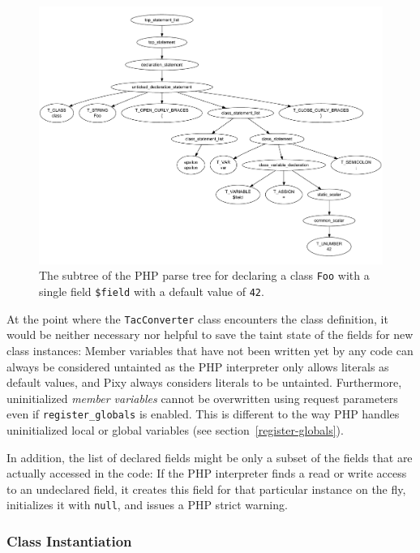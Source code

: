 \begin{figure}[htb]
  \begin{center}
    \includegraphics[scale=0.5]{images/parsetree-foo-class-declaration}
   \caption{The subtree of the PHP parse tree for declaring a class \texttt{Foo} with a single field \texttt{\$field} with a default value of \texttt{42}.}
   \label{fig:parse-tree-foo-class}
  \end{center}
\end{figure}

At the point where the \texttt{TacConverter} class encounters the class definition, it would be neither necessary nor helpful to save the taint state of the fields for new class instances: Member variables that have not been written yet by any code can always be considered untainted as the PHP interpreter only allows literals as default values, and Pixy always considers literals to be untainted. Furthermore, uninitialized \emph{member variables} cannot be overwritten using request parameters even if \texttt{register\_globals} is enabled. This is different to the way PHP handles uninitialized local or global variables (see section~\ref{register-globals}).

In addition, the list of declared fields might be only a subset of the fields that are actually accessed in the code: If the PHP interpreter finds a read or write access to an undeclared field, it creates this field for that particular instance on the fly, initializes it with \texttt{null}, and issues a PHP strict warning.


\subsubsection{Class Instantiation}

